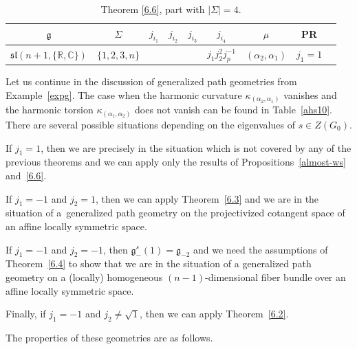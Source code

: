 \documentclass[pdftex]{sigma}
\newcommand{\Si}{\Sigma}
\newcommand{\fg}{\mathfrak g}
\numberwithin{equation}{section}
\begin{document}
\begin{table}[th!]\centering\caption{Theorem \ref{6.6}, part with $|\Si|=4$.}\label{ahs12}\vspace{1mm}

\begin{tabular}{|c|c|c|c|c|c|c|c|c|}
\hline
$\fg$ & $\Sigma$ & $j_{i_1}$& $j_{i_2}$& $j_{i_3}$& $j_{i_4}$& $\mu$& PR \\
\hline
\hline
$\mathfrak{sl}(n+1,\{\mathbb{R, C}\})$ & $\{1,2,3,n\}$&&&&$j_1j_2^2j_p^{-1}$&$(\alpha_2,\alpha_1)$&$j_1=1$\\
\hline
\end{tabular}
\end{table}

\begin{Example}
Let us continue in the discussion of generalized path geometries from Examp\-le~\ref{expg}. The case when the harmonic curvature $\kappa_{(\alpha_2,\alpha_1)}$ vanishes and the harmonic torsion $\kappa_{(\alpha_1,\alpha_2)}$ does not vanish can be found in Table~\ref{ahs10}. There are several possible situations depending on the eigenvalues of $s\in Z(G_0)$.

If $j_1=1$, then we are precisely in the situation which is not covered by any of the previous theorems and we can apply only the results of Propositions~\ref{almost-ws} and~\ref{6.6}.

If $j_1=-1$ and $j_2=1$, then we can apply Theorem~\ref{6.3} and we are in the situation of a~generalized path geometry on the projectivized cotangent space of an af\/f\/ine locally symmetric space.

If $j_1=-1$ and $j_2=-1$, then $\fg_-^s(1)=\fg_{-2}$ and we need the assumptions of Theorem~\ref{6.4} to show that we are in the situation of a generalized path geometry on a (locally) homogeneous $(n-1)$-dimensional f\/iber bundle over an af\/f\/ine locally symmetric space.

Finally, if $j_1=-1$ and $j_2\neq \sqrt{1}$, then we can apply Theorem~\ref{6.2}.
\end{Example}

The properties of these geometries are as follows.
\end{document}
